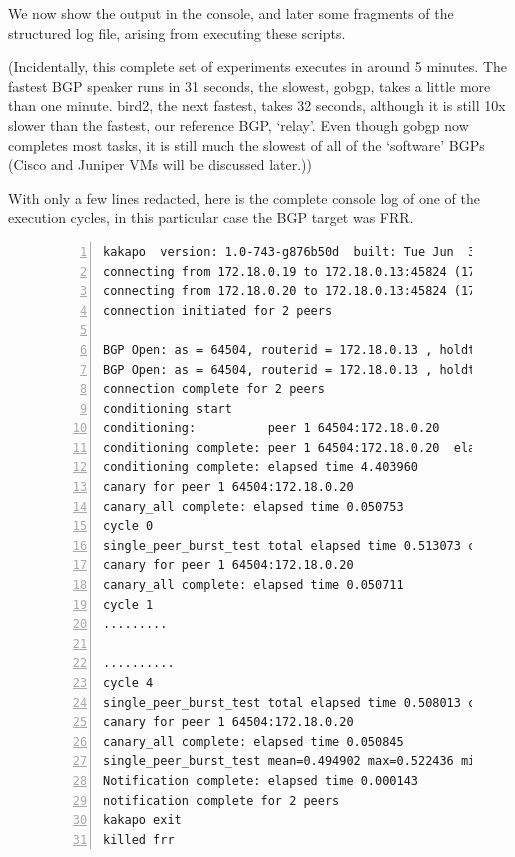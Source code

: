 We now show the output in the console, and later some fragments of the structured log file, arising from executing these scripts.

(Incidentally, this complete set of experiments executes in around 5 minutes.
The fastest BGP speaker runs in 31 seconds, the slowest, gobgp, takes a little more than one minute.  bird2, the next fastest, takes 32 seconds, although it is still 10x slower than the fastest, our reference BGP, `relay'.  Even though gobgp now completes most tasks, it is still much the slowest of all of the `software' BGPs (Cisco and Juniper VMs will be discussed later.))

With only a few lines redacted, here is the complete console log of one of the execution cycles, in this particular case the BGP target was FRR.

\begin{figure}[H]
\begin{adjustbox}{}

\begin{lstlisting}[numbers=left]
kakapo  version: 1.0-743-g876b50d  built: Tue Jun  3 05:55:51 UTC 2025  branch: main
connecting from 172.18.0.19 to 172.18.0.13:45824 (179) (0)
connecting from 172.18.0.20 to 172.18.0.13:45824 (179) (0)
connection initiated for 2 peers

BGP Open: as = 64504, routerid = 172.18.0.13 , holdtime = 180, opt params = 0206010400010001020280000202020002024600020641040000fbf8020206000206450400010101020a490806616c656630310002044002c0780209470700010180000000
BGP Open: as = 64504, routerid = 172.18.0.13 , holdtime = 180, opt params = 0206010400010001020280000202020002024600020641040000fbf8020206000206450400010101020a490806616c656630310002044002c0780209470700010180000000
connection complete for 2 peers
conditioning start
conditioning:          peer 1 64504:172.18.0.20
conditioning complete: peer 1 64504:172.18.0.20  elapsed time 4.360066
conditioning complete: elapsed time 4.403960
canary for peer 1 64504:172.18.0.20
canary_all complete: elapsed time 0.050753
cycle 0
single_peer_burst_test total elapsed time 0.513073 count 100000 (transmit 0.005274) (receive 0.512899)
canary for peer 1 64504:172.18.0.20
canary_all complete: elapsed time 0.050711
cycle 1
.........

..........
cycle 4
single_peer_burst_test total elapsed time 0.508013 count 100000 (transmit 0.010109) (receive 0.507823)
canary for peer 1 64504:172.18.0.20
canary_all complete: elapsed time 0.050845
single_peer_burst_test mean=0.494902 max=0.522436 min=0.474067
Notification complete: elapsed time 0.000143
notification complete for 2 peers
kakapo exit
killed frr
\end{lstlisting}
\end{adjustbox}
\end{figure}

